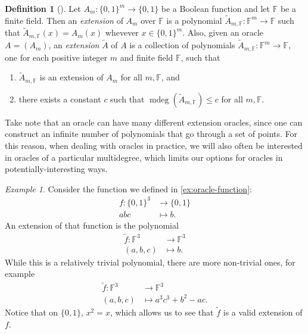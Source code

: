 \documentclass[english]{reedthesis}
\theoremstyle{plain}
\theoremstyle{definition}
\newtheorem{defn}[defn]{Definition}
\theoremstyle{remark}
\newtheorem{example}{Example}[thm]
\DeclareMathOperator{\mdeg}{mdeg}
\begin{document}
\begin{defn}[{\cite[Def.\ 2.2]{AW09}}]\label{def:ext-oracle}
  Let $A_{m}: \{0, 1\}^{m} \rightarrow \{0, 1\}$ be a Boolean function and let
  $\mathbb{F}$ be a finite field. Then an \emph{extension} of $A_{m}$ over
  $\mathbb{F}$ is a polynomial
  $\tilde{A}_{m,\mathbb{F}}: \mathbb{F}^{m} \rightarrow \mathbb{F}$ such that
  $\tilde{A}_{m,\mathbb{F}}(x) = A_{m}(x)$ whevever $x \in \{0, 1\}^{m}$. Also,
  given an oracle $A = (A_{m})$, an \emph{extension} $\tilde{A}$ of $A$ is a
  collection of polynomials
  $\tilde{A}_{m,\mathbb{F}}: \mathbb{F}^{m} \rightarrow \mathbb{F}$, one for each positive
  integer $m$ and finite field $\mathbb{F}$, such that
  \begin{enumerate}
    \item $\tilde{A}_{m,\mathbb{F}}$ is an extension of $A_{m}$ for all
          $m,\mathbb{F}$, and
    \item there exists a constant $c$ such that
          $\mdeg(\tilde{A}_{m,\mathbb{F}}) \le c$ for all $m, \mathbb{F}$.
  \end{enumerate}
\end{defn}

Take note that an oracle can have many different extension oracles, since one
can construct an infinite number of polynomials that go through a set of points.
For this reason, when dealing with oracles in practice, we will also often be
interested in oracles of a particular multidegree, which limits our options for
oracles in potentially-interesting ways.

\begin{example}\label{ex:oracle-function-ext}
  Consider the function we defined in \cref{ex:oracle-function}:
  \begin{equation}
    \begin{aligned}
      f: \{0, 1\}^{3} &\rightarrow \{0, 1\} \\
      abc &\mapsto b.
    \end{aligned}
  \end{equation}
  An extension of that function is the polynomial
  \begin{equation}
    \begin{aligned}
      \tilde{f}: \mathbb{F}^{3} &\rightarrow \mathbb{F}^{3} \\
      (a,b,c) &\mapsto b.
    \end{aligned}
  \end{equation}
  While this is a relatively trivial polynomial, there are more non-trivial
  ones, for example
  \begin{equation}
    \begin{aligned}
      \tilde{f}: \mathbb{F}^{3} &\rightarrow \mathbb{F}^{3} \\
      (a,b,c) &\mapsto a^{3}c^{3} + b^{2} - ac.
    \end{aligned}
  \end{equation}
  Notice that on $\{0, 1\}$, $x^{2} = x$, which allows us to see that
  $\tilde{f}$ is a valid extension of $f$.
\end{example}
\end{document}
